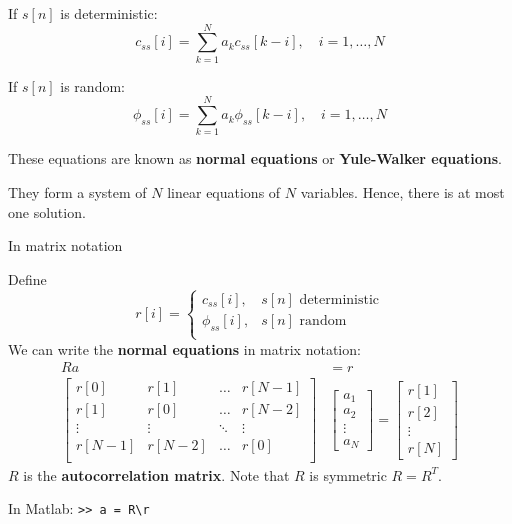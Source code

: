\documentclass[10pt]{beamer}
\begin{document}
\begin{frame}
	If $s[n]$ is deterministic:
	\begin{equation*}
		c_{ss}[i] = \sum_{k = 1}^N a_kc_{ss}[k-i],  \quad i = 1, \ldots,N
	\end{equation*}
	
	
	If $s[n]$ is random: 
	\begin{equation*}
	\phi_{ss}[i] = \sum_{k = 1}^N a_k\phi_{ss}[k-i], \quad i = 1, \ldots,N
	\end{equation*}
	
	These equations are known as \textbf{normal equations} or \textbf{Yule-Walker equations}.
	
	\vspace{0.25cm}
	They form a system of $N$ linear equations of $N$ variables. Hence, there is at most one solution.
\end{frame}

\begin{frame}{In matrix notation}

Define
\begin{equation*}
	r[i] = \begin{cases}
	c_{ss}[i], & \text{$s[n]$ deterministic} \\
	\phi_{ss}[i], & \text{$s[n]$ random} \\
	\end{cases}
\end{equation*}
We can write the \textbf{normal equations} in matrix notation:
\begin{align*}
	Ra &= r \\
	\begin{bmatrix}
	r[0] & r[1] & \ldots & r[N-1] \\
	r[1] & r[0] & \ldots & r[N-2] \\
	\vdots & \vdots & \ddots & \vdots \\
	r[N-1] & r[N-2] & \ldots & r[0] \\
	\end{bmatrix}&\begin{bmatrix}
	a_1 \\
	a_2 \\
	\vdots \\
	a_N
	\end{bmatrix} = \begin{bmatrix}
	r[1] \\
	r[2] \\
	\vdots \\
	r[N]
	\end{bmatrix}
\end{align*}
$R$ is the \textbf{autocorrelation matrix}. Note that $R$ is symmetric $R = R^T$.

\vspace{0.5cm}
In Matlab: \texttt{>> a = R\textbackslash r}
\end{frame}
\end{document}
